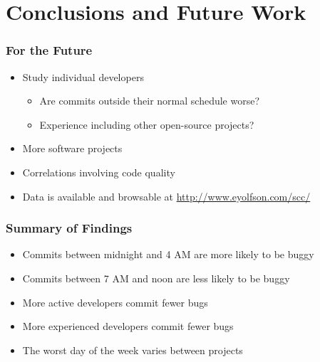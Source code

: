 \documentclass[aspectratio=43]{beamer}
\begin{document}
\section{Conclusions and Future Work}
\begin{frame}
  \frametitle{For the Future}

  \begin{itemize}
    \item Study individual developers
   
    \begin{itemize}
      \item Are commits outside their normal schedule worse?

      \item Experience including other open-source projects?
    \end{itemize}

    \item More software projects

    \item Correlations involving code quality

    \item Data is available and browsable at \url{http://www.eyolfson.com/scc/}
  \end{itemize}

\end{frame}

\begin{frame}
  \frametitle{Summary of Findings}
  
  \begin{itemize}
    \item Commits between midnight and 4 AM are more likely to be buggy

    \item Commits between 7 AM and noon are less likely to be buggy

    \item More active developers commit fewer bugs

    \item More experienced developers commit fewer bugs

    \item The worst day of the week varies between projects
  \end{itemize}
\end{frame}
\end{document}
